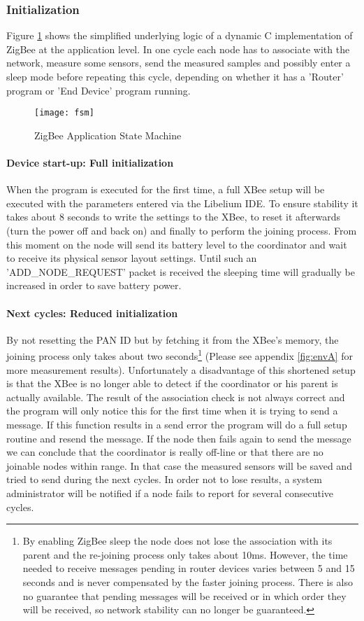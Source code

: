 \subsubsection{Initialization}
Figure \ref{fig:fsm} shows the simplified underlying logic of a dynamic C implementation of ZigBee at the application level. In one cycle each node has to associate with the network, measure some sensors, send the measured samples and possibly enter a sleep mode before repeating this cycle, depending on whether it has a 'Router' program or 'End Device' program running.\\ 
\begin{figure}[ht]
\centering
\texttt{[image: fsm]}
\caption{ZigBee Application State Machine}
\label{fig:fsm}
\end{figure}
\paragraph{Device start-up: Full initialization}
When the program is executed for the first time, a full XBee setup will be executed with the parameters entered via the Libelium IDE. To ensure stability it takes about 8 seconds to write the settings to the XBee, to reset it afterwards (turn the power off and back on) and finally to perform the joining process. From this moment on the node will send its battery level to the coordinator and wait to receive its physical sensor layout settings. Until such an 'ADD\_NODE\_REQUEST' packet is received the sleeping time will gradually be increased in order to save battery power.
\paragraph{Next cycles: Reduced initialization}
By not resetting the PAN ID but by fetching it from the XBee's memory, the joining process only takes about two seconds\footnote{By enabling ZigBee sleep the node does not lose the association with its parent and the re-joining process only takes about 10ms. However, the time needed to receive messages pending in router devices varies between 5 and 15 seconds and is never compensated by the faster joining process. There is also no guarantee that pending messages will be received or in which order they will be received, so network stability can no longer be guaranteed.} (Please see appendix \ref{fig:envA} for more measurement results). Unfortunately a disadvantage of this shortened setup is that the XBee is no longer able to detect if the coordinator or his parent is actually available. The result of the association check is not always correct and the program will only notice this for the first time when it is trying to send a message. If this function results in a send error the program will do a full setup routine and resend the message. If the node then fails again to send the message we can conclude that the coordinator is really off-line or that there are no joinable nodes within range. In that case the measured sensors will be saved and tried to send during the next cycles. In order not to lose results, a system administrator will be notified if a node fails to report for several consecutive cycles.

